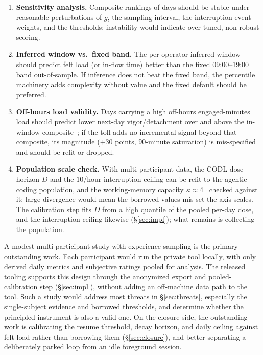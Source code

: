 \documentclass[10pt,twocolumn]{article}
\begin{document}
\begin{enumerate}
  watching''), $\beta$ can be estimated rather than assumed; the estimate's
  distance from $0.20$ quantifies the prior's error.
  \item \textbf{Sensitivity analysis.} Composite rankings of days should be
  stable under reasonable perturbations of $g$, the sampling interval, the
  interruption-event weights, and the thresholds; instability would indicate
  over-tuned, non-robust scoring.
  \item \textbf{Inferred window vs.\ fixed band.} The per-operator inferred
  window should predict felt load (or in-flow time) better than the fixed
  09:00--19:00 band out-of-sample. If inference does not beat the fixed band,
  the percentile machinery adds complexity without value and the fixed default
  should be preferred.
  \item \textbf{Off-hours load validity.} Days carrying a high off-hours
  engaged-minutes load should predict lower next-day vigor/detachment over
  and above the in-window composite~\cite{sonnentag2010}; if the toll adds
  no incremental signal beyond that composite, its magnitude
  ($+30$ points, $90$-minute saturation) is mis-specified and should be
  refit or dropped.
  \item \textbf{Population scale check.} With multi-participant data, the CODL
  dose horizon $D$ and the $10$/hour interruption ceiling can be refit to the
  agentic-coding population, and the working-memory capacity $\kappa\approx
  4$~\cite{cowan2001} checked against it; large divergence would mean the
  borrowed values mis-set the axis scales. The calibration step fits $D$ from a
  high quantile of the pooled per-day dose, and the interruption ceiling
  likewise (\S\ref{sec:impl}); what remains is collecting the population.
\end{enumerate}
A modest multi-participant study with experience sampling is the primary
outstanding work. Each participant would run the private tool locally, with only
derived daily metrics and subjective ratings pooled for analysis. The released
tooling supports this design through the anonymized export and pooled-calibration
step (\S\ref{sec:impl}), without adding an off-machine data path to the tool.
Such a study would address most threats in \S\ref{sec:threats}, especially the
single-subject evidence and borrowed thresholds, and determine whether the
principled instrument is also a valid one.
On the closure side, the outstanding work is calibrating the resume threshold,
decay horizon, and daily ceiling against felt load rather than borrowing them
(\S\ref{sec:closure}), and better separating a deliberately parked loop from an
idle foreground session.
\end{document}
